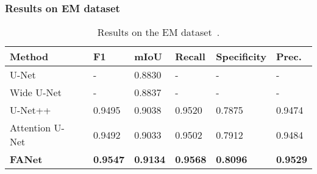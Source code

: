 \documentclass[journal]{IEEEtran}
\begin{document}
\subsubsection{Results on EM dataset}
\begin{table}[!t]
\footnotesize
\caption{Results on the EM dataset~\cite{cardona2010integrated}.}
\begin{tabular}{@{}l|l|l|l|l|l@{}}
\toprule
\textbf{Method} &\textbf{F1} &\textbf{mIoU} &\textbf{Recall} &\textbf{Specificity} & \textbf{Prec.} \\ 
\midrule
U-Net~\cite{ronneberger2015u}  & - & 0.8830 & - & - & - \\ Wide U-Net~\cite{zhou2018unet} & - & 0.8837 & - & - & - \\ U-Net++~\cite{zhou2018unet++} &0.9495 &0.9038 &0.9520 &0.7875 &0.9474 \\ Attention U-Net~\cite{oktay2018attention} &0.9492 &0.9033 &0.9502 &0.7912 &0.9484 \\ \textbf{FANet}& \textbf{0.9547} & \textbf{0.9134} & \textbf{0.9568} & \textbf{0.8096} & \textbf{0.9529} \\ 
\bottomrule
\end{tabular}
\label{tab:emdataset}
\end{table}
\end{document}
